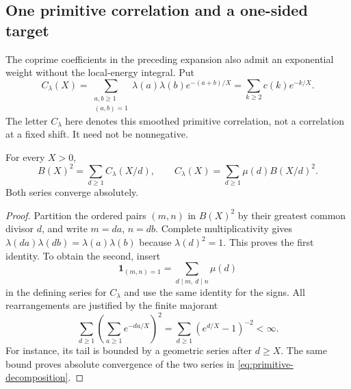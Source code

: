 \subsection{One primitive correlation and a one-sided target}
\label{ssec:primitive-energy}

The coprime coefficients in the preceding expansion also admit an
exponential weight without the local-energy integral. Put
\[
 C_\lambda(X)=\sum_{\substack{a,b\ge1\\(a,b)=1}}
       \lambda(a)\lambda(b)e^{-(a+b)/X}
       =\sum_{k\ge2}c(k)e^{-k/X}.
\]
The letter $C_\lambda$ here denotes this smoothed primitive correlation,
not a correlation at a fixed shift. It need not be nonnegative.

\begin{proposition}
\label{prop:primitive-decomposition}
For every $X>0$,
\begin{equation}\label{eq:primitive-decomposition}
 B(X)^2=\sum_{d\ge1}C_\lambda(X/d),\qquad
 C_\lambda(X)=\sum_{d\ge1}\mu(d)B(X/d)^2.
\end{equation}
Both series converge absolutely.
\end{proposition}
\begin{proof}
Partition the ordered pairs $(m,n)$ in $B(X)^2$ by their greatest
common divisor $d$, and write $m=da$, $n=db$. Complete
multiplicativity gives
$\lambda(da)\lambda(db)=\lambda(a)\lambda(b)$ because
$\lambda(d)^2=1$. This proves the first identity. To obtain the second,
insert
\[
 \mathbf1_{(m,n)=1}=\sum_{d\mid m,\ d\mid n}\mu(d)
\]
in the defining series for $C_\lambda$ and use the same identity for
the signs. All rearrangements are justified by the finite majorant
\[
 \sum_{d\ge1}\left(\sum_{a\ge1}e^{-da/X}\right)^2
       =\sum_{d\ge1}(e^{d/X}-1)^{-2}<\infty.
\]
For instance, its tail is bounded by a geometric series after
$d\ge X$. The same bound proves absolute convergence of the two
series in \eqref{eq:primitive-decomposition}.
\end{proof}

